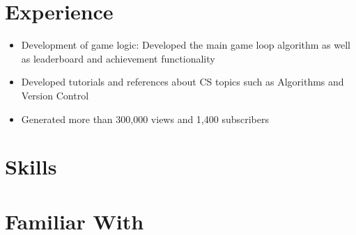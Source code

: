 \documentclass{my_cv}
\begin{document}
\section{Experience \faCogs}
\begin{itemize}
\item Development of game logic: Developed the main game loop algorithm as well as leaderboard and achievement functionality 
\end{itemize}
\begin{itemize}
\item Developed tutorials and references about CS topics
  such as Algorithms and Version Control
\item Generated more than 300,000 views and 1,400 subscribers 
\end{itemize}

\section{Skills \faBullseye}
\cvlistitem{\LaTeX}

\section{Familiar With \faPlusSign}

\end{document}
